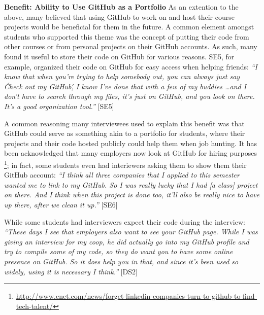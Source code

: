 
\textbf{Benefit: Ability to Use GitHub as a Portfolio}
As an extention to the above, many believed that using GitHub to work on and host their course projects would be beneficial for them in the future. A common element amongst students who supported this theme was the concept of putting their code from other courses or from personal projects on their GitHub accounts. As such, many found it useful to store their code on GitHub for various reasons. SE5, for example, organized their code on GitHub for easy access when helping friends: \textit{``I know that when you're trying to help somebody out, you can always just say \'Check out my GitHub\', I know I've done that with a few of my buddies \ldots and I don't have to search through my files, it's just on GitHub, and you look on there. It's a good organization tool.''} [SE5]

A common reasoning many interviewees used to explain this benefit was that GitHub could serve as something akin to a portfolio for students, where their projects and their code hosted publicly could help them when job hunting. It has been acknowledged that many employers now look at GitHub for hiring purposes \footnote{\url{http://www.cnet.com/news/forget-linkedin-companies-turn-to-github-to-find-tech-talent/}}; in fact, some students even had interiewers asking them to show them their GitHub account: \textit{``I think all three companies that I applied to this semester wanted me to link to my GitHub. So I was really lucky that I had [a class] project on there. And I think when this project is done too, it'll also be really nice to have up there, after we clean it up.''} [SE6]

While some students had interviewers expect their code during the interview: \textit{``These days I see that employers also want to see your GitHub page. While I was giving an interview for my coop, he did actually go into my GitHub profile and try to compile some of my code, so they do want you to have some online presence on GitHub. So it does help you in that, and since it's been used so widely, using it is necessary I think.''} [DS2]


